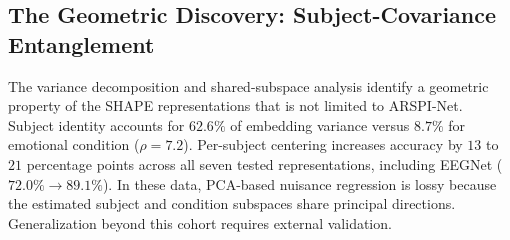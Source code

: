 \begin{table}[t]
\centering
\caption{Operational interpretability comparison for the architectures considered in this dissertation. \checkmark = directly exposed, $\sim$ = post-hoc or partial, and \texttimes = not provided in the cited implementation. Entries summarize the specific analyses reviewed here rather than every possible implementation of each architecture.}
\label{tab:sota_comparison}
\small
{}
\end{table}

\subsection{The Geometric Discovery: Subject-Covariance Entanglement}

The variance decomposition and shared-subspace analysis identify a geometric property of the SHAPE representations that is not limited to ARSPI-Net. Subject identity accounts for $62.6\%$ of embedding variance versus $8.7\%$ for emotional condition ($\rho = 7.2$). Per-subject centering increases accuracy by $13$ to $21$ percentage points across all seven tested representations, including EEGNet ($72.0\% \to 89.1\%$). In these data, PCA-based nuisance regression is lossy because the estimated subject and condition subspaces share principal directions. Generalization beyond this cohort requires external validation.

